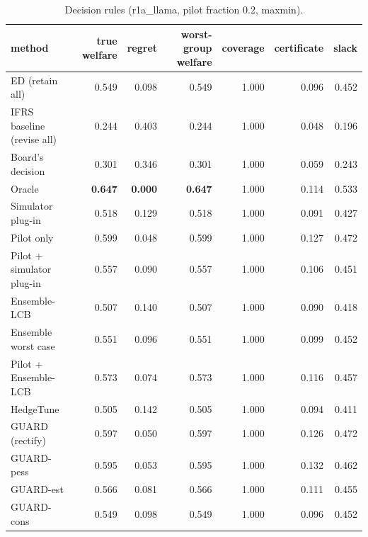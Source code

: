 \begin{table}[t]
\centering
\small
\begin{tabular}{lrrrrrr}
\toprule
method & true welfare & regret & worst-group welfare & coverage & certificate & slack \\
\midrule
ED (retain all) & 0.549 & 0.098 & 0.549 & 1.000 & 0.096 & 0.452 \\
IFRS baseline (revise all) & 0.244 & 0.403 & 0.244 & 1.000 & 0.048 & 0.196 \\
Board's decision & 0.301 & 0.346 & 0.301 & 1.000 & 0.059 & 0.243 \\
Oracle & \textbf{0.647} & \textbf{0.000} & \textbf{0.647} & 1.000 & 0.114 & 0.533 \\
Simulator plug-in & 0.518 & 0.129 & 0.518 & 1.000 & 0.091 & 0.427 \\
Pilot only & 0.599 & 0.048 & 0.599 & 1.000 & 0.127 & 0.472 \\
Pilot + simulator plug-in & 0.557 & 0.090 & 0.557 & 1.000 & 0.106 & 0.451 \\
Ensemble-LCB & 0.507 & 0.140 & 0.507 & 1.000 & 0.090 & 0.418 \\
Ensemble worst case & 0.551 & 0.096 & 0.551 & 1.000 & 0.099 & 0.452 \\
Pilot + Ensemble-LCB & 0.573 & 0.074 & 0.573 & 1.000 & 0.116 & 0.457 \\
HedgeTune & 0.505 & 0.142 & 0.505 & 1.000 & 0.094 & 0.411 \\
GUARD (rectify) & 0.597 & 0.050 & 0.597 & 1.000 & 0.126 & 0.472 \\
GUARD-pess & 0.595 & 0.053 & 0.595 & 1.000 & 0.132 & 0.462 \\
GUARD-est & 0.566 & 0.081 & 0.566 & 1.000 & 0.111 & 0.455 \\
GUARD-cons & 0.549 & 0.098 & 0.549 & 1.000 & 0.096 & 0.452 \\
\bottomrule
\end{tabular}
\caption{Decision rules (r1a\_llama, pilot fraction 0.2, maxmin).}
\label{tab:methods-maxmin}
\end{table}

